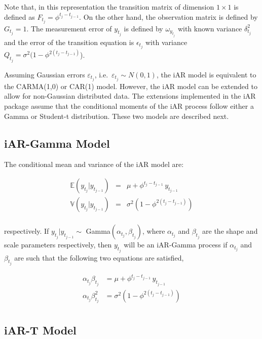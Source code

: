 Note that, in this representation the transition matrix of dimension \(1\times1\) is defined as \(F_{t_j} = \phi^{t_j-t_{j-1}}\). On the other hand, the observation matrix is defined by \(G_{t_j} = 1\). The measurement error of \(y_{t_j}\) is defined by \(\omega_{y_{t_j}}\) with known variance \(\delta^2_{t_j}\) and the error of the transition equation is \(\epsilon_{t_j}\) with variance \(Q_{t_j} =\sigma^2(1-\phi^{2(t_j-t_{j-1})}\)).

Assuming Gaussian errors \(\varepsilon_{t_j}\), i.e.~\(\varepsilon_{t_j}\sim N(0,1)\), the iAR model is equivalent to the CARMA(1,0) or CAR(1) model. However, the iAR model can be extended to allow for non-Gaussian distributed data. The extensions implemented in the iAR package assume that the conditional moments of the iAR process follow either a Gamma or Student-t distribution. These two models are described next.

\subsection{iAR-Gamma Model}\label{iar-gamma-model}

The conditional mean and variance of the iAR model are:

\begin{eqnarray*}
\mathbb{E}(y_{t_j}|y_{t_{j-1}})&=& \mu + \phi^{t_j-t_{j-1}} \, y_{t_{j-1}}\\
\mathbb{V}(y_{t_j}|y_{t_{j-1}})&=& \sigma^2 \left(1-\phi^{2(t_j-t_{j-1})}\right)\\
\end{eqnarray*}

respectively. If \(y_{t_j}|y_{t_{j-1}} \sim\) Gamma\((\alpha_{t_j},\beta_{t_j})\), where \(\alpha_{t_j}\) and \(\beta_{t_j}\) are the shape and scale parameters respectively, then \(y_{t_j}\) will be an iAR-Gamma process if \(\alpha_{t_j}\) and \(\beta_{t_j}\) are such that the following two equations are satisfied,

\begin{equation}
\begin{split}
\alpha_{t_j}\beta_{t_j} &= \mu + \phi^{t_j-t_{j-1}} \, y_{t_{j-1}}\\
\alpha_{t_j}\beta_{t_j}^2 &= \sigma^2 \left(1-\phi^{2(t_j-t_{j-1})}\right)\\
\end{split}
\label{eq:IARGamma}
\end{equation}

\subsection{iAR-T Model}\label{iar-t-model}

